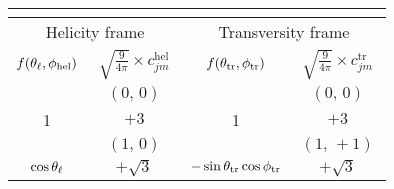 \begin{table}[p]
  \centering \footnotesize
  \begin{tabular}{| c | c c c c c c || c | c c c c c c |}
    \multicolumn{1}{c}{\hspace*{1em}} & \multicolumn{1}{c}{\hspace*{1em}}   &
      \multicolumn{1}{c}{\hspace*{1em}} & \multicolumn{1}{c}{\hspace*{1em}} &
      \multicolumn{1}{c}{\hspace*{1em}} & \multicolumn{1}{c}{\hspace*{1em}} &
      \multicolumn{1}{c}{\hspace*{1em}} & \multicolumn{1}{c}{\hspace*{1em}} &
      \multicolumn{1}{c}{\hspace*{1em}} & \multicolumn{1}{c}{\hspace*{1em}} &
      \multicolumn{1}{c}{\hspace*{1em}} & \multicolumn{1}{c}{\hspace*{1em}} &
      \multicolumn{1}{c}{\hspace*{1em}} & \multicolumn{1}{c}{\hspace*{1em}} \\
    \hline

    \multicolumn{7}{|c||}{Helicity frame} & \multicolumn{7}{c|}{Transversity frame} \\
    \hline

    $f(\theta_\ell, \phi_\text{hel})$
      &  \multicolumn{6}{c||}{$\sqrt{\frac{9}{4\pi}} \times c_{jm}^\text{hel}$}
      & $f(\theta_\text{tr}, \phi_\text{tr})$
      &  \multicolumn{6}{c|}{$\sqrt{\frac{9}{4\pi}} \times c_{jm}^\text{tr}$} \\
    \hline\hline

       &  \multicolumn{6}{c||}{$(0,\,0)$}  &
       &  \multicolumn{6}{c|}{$(0,\,0)$}   \\
    \cline{2-7}\cline{9-14}
    1  &  \multicolumn{6}{c||}{$+3$}           &
    1  &  \multicolumn{6}{c|}{$+3$}            \\
    \hline

                                &  \multicolumn{6}{c||}{$(1,\,0)$}  &
                                &  \multicolumn{6}{c|}{$(1,\,+1)$}     \\
    \cline{2-7}\cline{9-14}
    $\cos\theta_\ell$               &  \multicolumn{6}{c||}{$+\sqrt{3}$}    &
    $-\sin\theta_\text{tr} \cos\phi_\text{tr}$  &  \multicolumn{6}{c|}{$+\sqrt{3}$}     \\
    \hline


\end{tabular}
\end{table}
